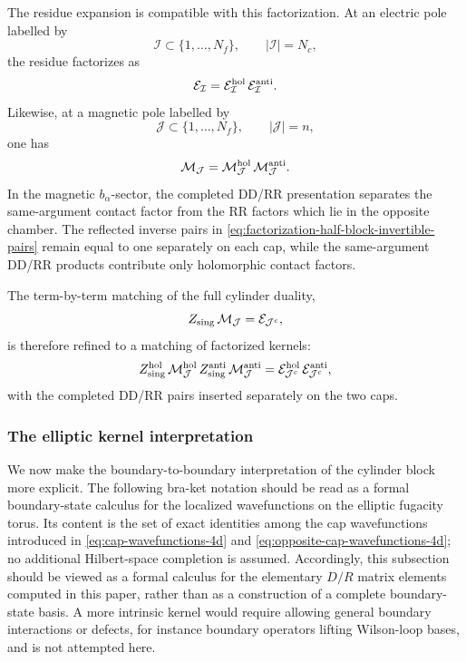 \documentclass[11pt,a4paper]{article}
\numberwithin{equation}{section}
\theoremstyle{plain}
\theoremstyle{definition}
\theoremstyle{remark}
\begin{document}
The residue expansion is compatible with this factorization. At an electric pole labelled by
\begin{equation}
\mathcal I\subset\{1,\ldots,N_f\},
\qquad
|\mathcal I|=N_c,
\end{equation}
the residue factorizes as
\begin{equation}
\mathcal E_{\mathcal I}
=
\mathcal E_{\mathcal I}^{\rm hol}\,
\mathcal E_{\mathcal I}^{\rm anti}.
\label{eq:electric-residue-factorization}
\end{equation}
Likewise, at a magnetic pole labelled by
\begin{equation}
\mathcal J\subset\{1,\ldots,N_f\},
\qquad
|\mathcal J|=n,
\end{equation}
one has
\begin{equation}
\mathcal M_{\mathcal J}
=
\mathcal M_{\mathcal J}^{\rm hol}\,
\mathcal M_{\mathcal J}^{\rm anti}.
\label{eq:magnetic-residue-factorization}
\end{equation}
In the magnetic \(b_\alpha\)-sector, the completed DD/RR presentation separates the same-argument contact factor from the RR factors which lie in the opposite chamber. The reflected inverse pairs in \eqref{eq:factorization-half-block-invertible-pairs} remain equal to one separately on each cap, while the same-argument DD/RR products contribute only holomorphic contact factors.

The term-by-term matching of the full cylinder duality,
\begin{equation}
Z_{\rm sing}\,\mathcal M_{\mathcal J}
=
\mathcal E_{\mathcal J^c},
\end{equation}
is therefore refined to a matching of factorized kernels:
\begin{equation}
Z_{\rm sing}^{\rm hol}\,
\mathcal M_{\mathcal J}^{\rm hol}\,
Z_{\rm sing}^{\rm anti}\,
\mathcal M_{\mathcal J}^{\rm anti}
=
\mathcal E_{\mathcal J^c}^{\rm hol}\,
\mathcal E_{\mathcal J^c}^{\rm anti},
\label{eq:factorized-residue-matching}
\end{equation}
with the completed DD/RR pairs inserted separately on the two caps.


\subsubsection{The elliptic kernel interpretation}
\label{subsec:elliptic-kernel-interpretation}

We now make the boundary-to-boundary interpretation of the cylinder block more explicit.  The following bra-ket notation should be read as a formal boundary-state calculus for the localized wavefunctions on the elliptic fugacity torus.  Its content is the set of exact identities among the cap wavefunctions introduced in \eqref{eq:cap-wavefunctions-4d} and \eqref{eq:opposite-cap-wavefunctions-4d}; no additional Hilbert-space completion is assumed. Accordingly, this subsection should be viewed as a formal calculus for the elementary \(D/R\) matrix elements computed in this paper, rather than as a construction of a complete boundary-state basis. A more intrinsic kernel would require allowing general boundary interactions or defects, for instance boundary operators lifting Wilson-loop bases, and is not attempted here.
\end{document}
